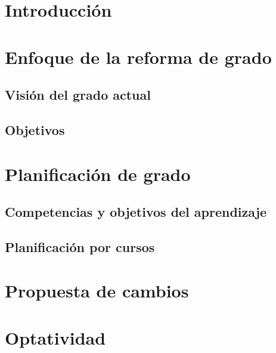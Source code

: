 \documentclass{article}
\begin{document}
\hypersetup{pageanchor=false}

\hypersetup{pageanchor=true}
\tableofcontents{}
\newpage{}

\section{Introducción}

\section{Enfoque de la reforma de grado}

\subsection{Visión del grado actual}

\subsection{Objetivos}

\section{Planificación de grado}

\subsection{Competencias y objetivos del aprendizaje}

\subsection{Planificación por cursos}

\section{Propuesta de cambios}

\section{Optatividad}
\end{document}
